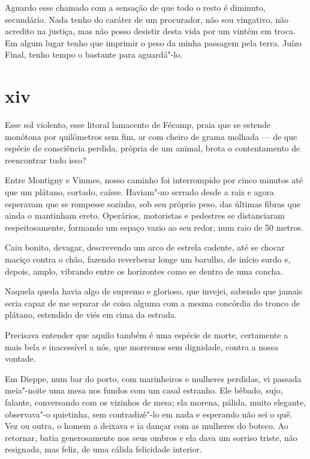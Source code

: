 Aguardo esse chamado com a sensação de que todo o resto é diminuto,
secundário. Nada tenho do caráter de um procurador, não sou vingativo,
não acredito na justiça, mas não posso desistir desta vida por um vintém
em troca. Em algum lugar tenho que imprimir o peso da minha passagem
pela terra. Juízo Final, tenho tempo o bastante para aguardá"-lo.

\section{xiv}


Esse sol violento, esse litoral lamacento de Fécamp, praia que se
estende monótona por quilômetros sem fim, ar com cheiro de grama
molhada --- de que espécie de consciência perdida, própria de um animal,
brota o contentamento de reencontrar tudo isso?

Entre Montigny e Vinmes, nosso caminho foi interrompido por cinco
minutos até que um plátano, cortado, caísse. Haviam"-no serrado desde a
raiz e agora esperavam que se rompesse sozinho, sob seu próprio peso,
das últimas fibras que ainda o mantinham ereto. Operários, motoristas e
pedestres se distanciaram respeitosamente, formando um espaço vazio ao
seu redor, num raio de 50 metros.

Caiu bonito, devagar, descrevendo um arco de estrela cadente, até se
chocar maciço contra o chão, fazendo reverberar longe um barulho, de
início surdo e, depois, amplo, vibrando entre os horizontes como se
dentro de uma concha.

Naquela queda havia algo de supremo e glorioso, que invejei, sabendo que
jamais seria capaz de me separar de coisa alguma com a mesma
concórdia do tronco de plátano, estendido de viés em cima da estrada.

Precisava entender que aquilo também é uma espécie de morte, certamente
a mais bela e inacessível a nós, que morremos sem dignidade,
contra a nossa vontade.

\asterisc

Em Dieppe, num bar do porto, com marinheiros e mulheres perdidas, vi
passada meia"-noite uma mesa nos fundos com um casal estranho. Ele
bêbado, sujo, falante, conversando com os vizinhos de mesa; ela morena,
pálida, muito elegante, observava"-o quietinha, sem contradizê"-lo em nada
e esperando não sei o quê. Vez ou outra, o homem a deixava e ia dançar
com as mulheres do boteco. Ao retornar, batia generosamente nos seus
ombros e ela dava um sorriso triste, não resignada, mas feliz, de uma
cálida felicidade interior.

